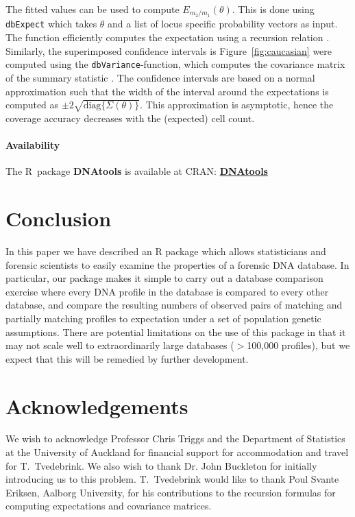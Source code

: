 \documentclass[a4paper,11pt]{article}
\newcommand{\proglang}[1]{\textsf{#1}}
\newcommand{\pkg}[1]{\textbf{#1}}
\newcommand{\code}[1]{\texttt{#1}}
\begin{document}
The fitted values can be used to compute $E_{m_2/m_1}(\theta)$. This
is done using \code{dbExpect} which takes $\theta$ and a list of locus
specific probability vectors as input. The function efficiently
computes the expectation using a recursion relation
\citep{tvedebrink2011}. Similarly, the superimposed confidence
intervals is Figure~\ref{fig:caucasian} were computed using the
\code{dbVariance}-function, which computes the covariance matrix of
the summary statistic \citep[also by recursion over
loci][]{tvedebrink2011}. The confidence intervals are based on a
normal approximation such that the width of the interval around the
expectations is computed as
$\pm2\sqrt{\text{diag}\{\Sigma(\theta)\}}$. This approximation is
asymptotic, hence the coverage accuracy decreases with the (expected)
cell count.

\paragraph{Availability}
\label{sec:software}

The \proglang{R}~package \pkg{DNAtools} is available at CRAN: 
\href{http://CRAN.R-project.org/package=DNAtools}{\pkg{DNAtools}}

\section[Conclusion]{Conclusion}
In this paper we have described an \proglang{R} package which allows
statisticians and forensic scientists to easily examine the properties
of a forensic DNA database. In particular, our package makes it simple
to carry out a database comparison exercise where every DNA profile in
the database is compared to every other database, and compare the
resulting numbers of observed pairs of matching and partially matching
profiles to expectation under a set of population genetic
assumptions. There are potential limitations on the use of this
package in that it may not scale well to extraordinarily large
databases ($>$100,000 profiles), but we expect that this will be
remedied by further development.

\section*{Acknowledgements}
We wish to acknowledge Professor Chris Triggs and the Department of
Statistics at the University of Auckland for financial support for
accommodation and travel for T.~Tvedebrink. We also wish to thank
Dr. John Buckleton for initially introducing us to this problem.
T.~Tvedebrink would like to thank Poul Svante Eriksen, Aalborg
University, for his contributions to the recursion formulas for
computing expectations and covariance matrices. 
\end{document}

